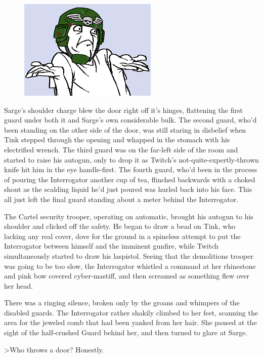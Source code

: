 \begin{figure}
	\begin{center}
		\includegraphics[width=\figwidth]{pics/18/26.png}
	\end{center}
\end{figure}
Sarge's shoulder charge blew the door right off it's hinges, flattening the first guard under both it and Sarge's own considerable bulk. 
The second guard, who'd been standing on the other side of the door, was still staring in disbelief when Tink stepped through the opening and whapped in the stomach with his electrified wrench. 
The third guard was on the far-left side of the room and started to raise his autogun, only to drop it as Twitch's not-quite-expertly-thrown knife hit him in the eye handle-first. 
The fourth guard, who'd been in the process of pouring the Interrogator another cup of tea, flinched backwards with a choked shout as the scalding liquid he'd just poured was hurled back into his face. 
This all just left the final guard standing about a meter behind the Interrogator.

The Cartel security trooper, operating on automatic, brought his autogun to his shoulder and clicked off the safety. 
He began to draw a bead on Tink, who lacking any real cover, dove for the ground in a spineless attempt to put the Interrogator between himself and the imminent gunfire, while Twitch simultaneously started to draw his laspistol. 
Seeing that the demolitions trooper was going to be too slow, the Interrogator whistled a command at her rhinestone and pink bow covered cyber-mastiff, and then screamed as something flew over her head.

There was a ringing silence, broken only by the groans and whimpers of the disabled guards. 
The Interrogator rather shakily climbed to her feet, scanning the area for the jeweled comb that had been yanked from her hair. 
She paused at the sight of the half-crushed Guard behind her, and then turned to glare at Sarge.

>Who throws a door? 
Honestly.

